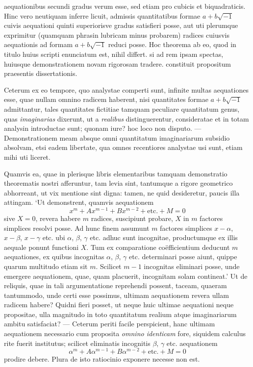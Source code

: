 aequationibus secundi gradus verum esse, sed etiam pro cubicis et biquadraticis.
Hinc vero neutiquam inferre licuit, admissis quantitatibus formae $a+b\sqrt{-1}$ cuivis aequationi quinti superiorisve gradus satisfieri posse, aut uti plerumque exprimitur (quamquam phrasin lubricam minus probarem) radices cuiusvis aequationis ad formam $a+b\sqrt{-1}$ reduci posse. Hoc theorema ab eo, quod in titulo
huius scripti enunciatum est, nihil differt. si ad rem ipsam spectas, huiusque demonstrationem novam rigorosam tradere. constituit propositum praesentis dissertationis.

Ceterum ex eo tempore, quo analystae comperti sunt, infinite multas aequationes esse, quae nullam omnino radicem haberent, nisi quantitates formae
$a+b\sqrt{-1}$ admittantur, tales quantitates fictitiae tamquam peculiare quantitatum genus, quas \textit{imaginarias} dixerunt, ut a \textit{realibus} distinguerentur, consideratae
et in totam analysin introductae sunt; quonam iure? hoc loco non disputo. --- Demonstrationem meam absque omni quantitatum imaginariarum subsidio absolvam, etsi eadem libertate, qua omnes recentiores analystae usi sunt, etiam mihi
uti liceret.

Quamvis ea, quae in plerisque libris elementaribus tamquam demonstratio
theorematis nostri afferuntur, tam levia sint, tantumque a rigore geometrico abhorreant, ut vix mentione sint digna: tamen, ne quid desideretur, paucis
illa attingam. `Ut demonstrent, quamvis aequationem
\[
x^m+Ax^{m-1}+Bx^{m-2}+\text{etc.}+M=0
\]
sive $X=0$, revera habere $m$ radices, suscipiunt probare, $X$ in $m$ factores
simplices resolvi posse. Ad hunc finem assumunt $m$ factores simplices $x-\alpha$,
$x-\beta$, $x-\gamma$ etc. ubi $\alpha$, $\beta$, $\gamma$ etc. adhuc sunt incognitae, productumque ex illis
aequale ponunt functioni $X$. Tum ex comparatione coëfficientium deducunt $m$
aequationes, ex quibus incognitas $\alpha$, $\beta$, $\gamma$ etc. determinari posse aiunt, quippe
quarum multitudo etiam sit $m$. Scilicet $m-1$ incognitas eliminari posse, unde
emergere aequationem, quae, quam placuerit, incognitam solam contineat.' Ut
de reliquis, quae in tali argumentatione reprehendi possent, taceam, quaeram
tantummodo, unde certi esse possimus, ultimam aequationem revera ullam radicem habere? Quidni fieri posset, ut neque huic ultimae aequationi neque propositae, ulla magnitudo in toto quantitatum realium atque imaginariarum ambitu
satisfaciat? --- Ceterum periti facile perspicient, hanc ultimam aequationem necessario cum proposita \textit{omnino identicam} fore, siquidem calculus rite fuerit institutus; scilicet eliminatis incognitis $\beta$, $\gamma$ etc. aequationem
\[
\alpha^m+A\alpha^{m-1}+B\alpha^{m-2}+\text{etc.}+M=0
\]
prodire debere. Plura de isto ratiocinio exponere necesse non est.

